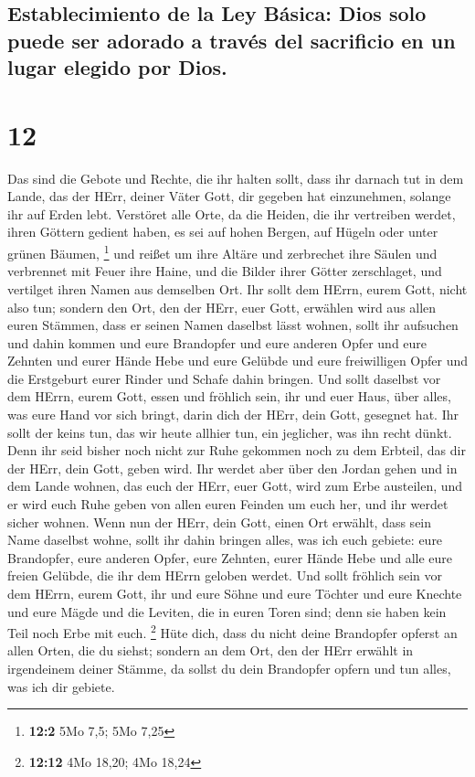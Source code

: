 \hypertarget{establecimiento-de-la-ley-buxe1sica-dios-solo-puede-ser-adorado-a-travuxe9s-del-sacrificio-en-un-lugar-elegido-por-dios.}{%
\subsection{Establecimiento de la Ley Básica: Dios solo puede ser
adorado a través del sacrificio en un lugar elegido por
Dios.}\label{establecimiento-de-la-ley-buxe1sica-dios-solo-puede-ser-adorado-a-travuxe9s-del-sacrificio-en-un-lugar-elegido-por-dios.}}

\hypertarget{section-11}{%
\section{12}\label{section-11}}

 Das sind die Gebote und Rechte, die ihr halten sollt,
dass ihr darnach tut in dem Lande, das der HErr, deiner Väter Gott, dir
gegeben hat einzunehmen, solange ihr auf Erden lebt. 
Verstöret alle Orte, da die Heiden, die ihr vertreiben werdet, ihren
Göttern gedient haben, es sei auf hohen Bergen, auf Hügeln oder unter
grünen Bäumen, \footnote{\textbf{12:2} 5Mo 7,5; 5Mo 7,25} 
und reißet um ihre Altäre und zerbrechet ihre Säulen und verbrennet mit
Feuer ihre Haine, und die Bilder ihrer Götter zerschlaget, und vertilget
ihren Namen aus demselben Ort.  Ihr sollt dem HErrn, eurem
Gott, nicht also tun;  sondern den Ort, den der HErr, euer
Gott, erwählen wird aus allen euren Stämmen, dass er seinen Namen
daselbst lässt wohnen, sollt ihr aufsuchen und dahin kommen
 und eure Brandopfer und eure anderen Opfer und eure
Zehnten und eurer Hände Hebe und eure Gelübde und eure freiwilligen
Opfer und die Erstgeburt eurer Rinder und Schafe dahin bringen.
 Und sollt daselbst vor dem HErrn, eurem Gott, essen und
fröhlich sein, ihr und euer Haus, über alles, was eure Hand vor sich
bringt, darin dich der HErr, dein Gott, gesegnet hat.  Ihr
sollt der keins tun, das wir heute allhier tun, ein jeglicher, was ihn
recht dünkt.  Denn ihr seid bisher noch nicht zur Ruhe
gekommen noch zu dem Erbteil, das dir der HErr, dein Gott, geben wird.
 Ihr werdet aber über den Jordan gehen und in dem Lande
wohnen, das euch der HErr, euer Gott, wird zum Erbe austeilen, und er
wird euch Ruhe geben von allen euren Feinden um euch her, und ihr werdet
sicher wohnen.  Wenn nun der HErr, dein Gott, einen Ort
erwählt, dass sein Name daselbst wohne, sollt ihr dahin bringen alles,
was ich euch gebiete: eure Brandopfer, eure anderen Opfer, eure Zehnten,
eurer Hände Hebe und alle eure freien Gelübde, die ihr dem HErrn geloben
werdet.  Und sollt fröhlich sein vor dem HErrn, eurem
Gott, ihr und eure Söhne und eure Töchter und eure Knechte und eure
Mägde und die Leviten, die in euren Toren sind; denn sie haben kein Teil
noch Erbe mit euch. \footnote{\textbf{12:12} 4Mo 18,20; 4Mo 18,24}
 Hüte dich, dass du nicht deine Brandopfer opferst an
allen Orten, die du siehst;  sondern an dem Ort, den der
HErr erwählt in irgendeinem deiner Stämme, da sollst du dein Brandopfer
opfern und tun alles, was ich dir gebiete.

